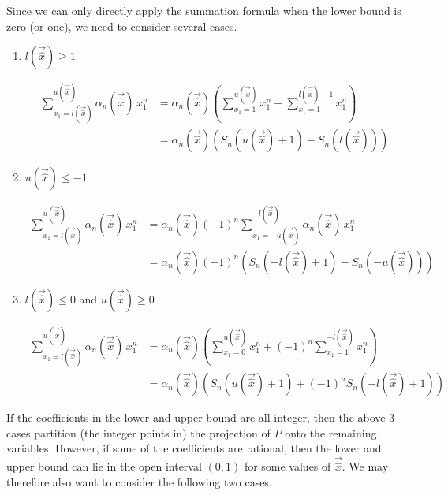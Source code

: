 Since we can only directly apply the summation formula when
the lower bound is zero (or one), we need to consider several
cases.
\begin{enumerate}
\item $l(\vec {\hat x}) \ge 1$
\label{i:l}

\begin{align*}
\sum_{x_1 = l(\vec {\hat x})}^{u(\vec{\hat x})} \alpha_n(\vec{\hat x}) \, x_1^n
& =
\alpha_n(\vec{\hat x})
\left(
\sum_{x_1 = 1}^{u(\vec{\hat x})} x_1^n
-
\sum_{x_1 = 1}^{l(\vec {\hat x})-1} x_1^n
\right)
\\
& =
\alpha_n(\vec{\hat x})
\left( S_n(u(\vec{\hat x})+1) - S_n(l(\vec {\hat x})) \right)
\end{align*}

\item $u(\vec{\hat x}) \le -1$
\label{i:u}

\begin{align*}
\sum_{x_1 = l(\vec {\hat x})}^{u(\vec{\hat x})} \alpha_n(\vec{\hat x}) \, x_1^n
& =
\alpha_n(\vec{\hat x}) (-1)^n
\sum_{x_1 = -u(\vec {\hat x})}^{-l(\vec{\hat x})} \alpha_n(\vec{\hat x}) \, x_1^n
\\
& =
\alpha_n(\vec{\hat x}) (-1)^n
\left( S_n(-l(\vec{\hat x})+1) - S_n(-u(\vec {\hat x})) \right)
\end{align*}

\item $l(\vec {\hat x}) \le 0$ and $u(\vec{\hat x}) \ge 0$
\label{i:l:u}

\begin{align*}
\sum_{x_1 = l(\vec {\hat x})}^{u(\vec{\hat x})} \alpha_n(\vec{\hat x}) \, x_1^n
& =
\alpha_n(\vec{\hat x})
\left(
\sum_{x_1 = 0}^{u(\vec{\hat x})} x_1^n
+
(-1)^n
\sum_{x_1 = 1}^{-l(\vec {\hat x})} x_1^n
\right)
\\
& =
\alpha_n(\vec{\hat x})
\left(
S_n(u(\vec{\hat x})+1)
+
(-1)^n
S_n(-l(\vec{\hat x})+1)
\right)
\end{align*}

\setcounter{saveenumi}{\value{enumi}}
\end{enumerate}

If the coefficients in the lower and upper bound are all
integer, then the above 3 cases partition (the integer points in)
the projection of $P$ onto the remaining variables.
However, if some of the coefficients are rational, then the lower
and upper bound can lie in the open interval $(0,1)$ for some
values of $\vec{\hat x}$.  We may therefore also want to consider
the following two cases.

